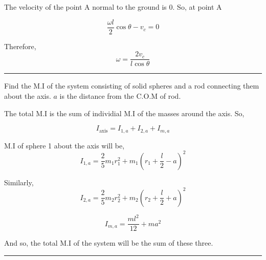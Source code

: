 \documentclass[twocolumn]{article}
\begin{document}
The velocity of the point A normal to the ground is 0. So, at point A

\[
    \frac{\omega l}{2} \cos \theta - v_c = 0
\]

Therefore, 
\[
    \boxed{\omega = \frac{2v_c}{l \cos \theta }}
\]

\vspace{0.1in}
\hrule

\begin{question}
    Find the M.I of the system consisting of solid spheres and a rod connecting them about the axis. \(a\) is the distance from the C.O.M of rod. 
    \begin{center}
    \end{center}
\end{question}

The total M.I is the sum of individial M.I of the masses around the axis. So, 

\[
    I_{\text{axis} } = I_{1,a} + I_{2,a} + I_{m,a} 
\]

M.I of sphere 1 about the axis will be, 
\[
    I_{1,a} = \frac{2}{5}m_1 r_{1}^{2} + m_1 (r_1 + \frac{l}{2} - a)^{2} 
\]

Similarly, 
\[
    I_{2,a} = \frac{2}{5}m_2 r_{2}^{2} + m_2 (r_2 + \frac{l}{2} + a)^{2}
\]

\[
    I_{m,a} = \frac{ml^{2}}{12} + ma^{2} 
\]

And so, the total M.I of the system will be the sum of these three. 

\vspace{0.1in}
\hrule 
\end{document}
